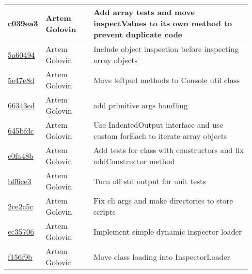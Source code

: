 \begin{tabularx}{\textwidth}{l l X}
\href{https://github.com/awave1/assessment-loan-system/commit/c039ea3e021ec865e6318bafcb992de302e1b03f}{c039ea3} & Artem Golovin & Add array tests and move inspectValues to its own method to prevent duplicate code\\ \hline
\href{https://github.com/awave1/assessment-loan-system/commit/5a60494c178ae449c73b64573945d738fa660fbc}{5a60494} & Artem Golovin & Include object inspection before inspecting array objects\\ \hline
\href{https://github.com/awave1/assessment-loan-system/commit/5e47e8d3c80ca582c40d589319183ff8bbc04975}{5e47e8d} & Artem Golovin & Move leftpad methods to Console util class\\ \hline
\href{https://github.com/awave1/assessment-loan-system/commit/66343ed9e306d8d95fc154743233476df9d8e01b}{66343ed} & Artem Golovin & add primitive args handling\\ \hline
\href{https://github.com/awave1/assessment-loan-system/commit/645bfdce0ecb6be66d752fd30a505777d78f0cc4}{645bfdc} & Artem Golovin & Use IndentedOutput interface and use custom forEach to iterate array objects\\ \hline
\href{https://github.com/awave1/assessment-loan-system/commit/c0fa48ba955e0b6b2a3a5b4cea0799a48608cd52}{c0fa48b} & Artem Golovin & Add tests for class with constructors and fix addConstructor method\\ \hline
\href{https://github.com/awave1/assessment-loan-system/commit/bff6ce3c5e65af191b41dbea9ac64098c79f8d77}{bff6ce3} & Artem Golovin & Turn off std output for unit tests\\ \hline
\href{https://github.com/awave1/assessment-loan-system/commit/2ce2c5cbcab69a44628f32983d441161834f1c94}{2ce2c5c} & Artem Golovin & Fix cli args and make directories to store scripts\\ \hline
\href{https://github.com/awave1/assessment-loan-system/commit/ec357060b553399d386e08a757cf66dfdc4cd7a8}{ec35706} & Artem Golovin & Implement simple dynamic inspector loader\\ \hline
\href{https://github.com/awave1/assessment-loan-system/commit/f156f9b121be09cd64888343984a15e279719ded}{f156f9b} & Artem Golovin & Move class loading into InspectorLoader\\ \hline
\end{tabularx}

